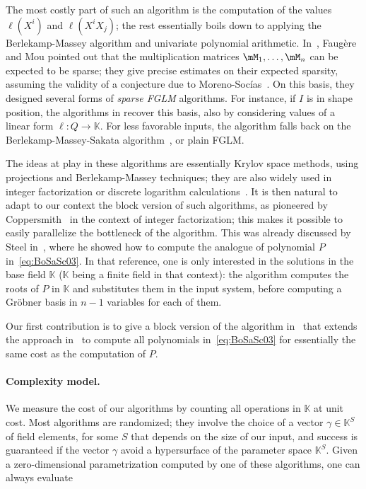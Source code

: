 \documentclass[12pt]{article}
\def\K{\mathbb{K}}
\def\K {\ensuremath{\mathbb{K}}}
\begin{document}
The most costly part of such an algorithm is the computation of the
values $\ell(X^i)$ and $\ell(X^i X_j)$; the rest essentially boils
down to applying the Berlekamp-Massey algorithm and univariate
polynomial arithmetic. In~\cite{FaMo17}, Faug{\`e}re and Mou pointed
out that the multiplication matrices $\mM_1,\dots,\mM_n$ can be
expected to be sparse; they give precise estimates on their expected
sparsity, assuming the validity of a conjecture due to
Moreno-Soc\'ias~\cite{MorenoSocias91}. 
On this basis, they designed several forms of {\em sparse FGLM}
algorithms. For instance, if $I$ is in shape position, the algorithms
in \cite{FaMo17} recover this basis, also by considering values of
a linear form $\ell:Q \to \K$. For less favorable inputs, the algorithm
falls back on the Berlekamp-Massey-Sakata algorithm~\cite{Sakata90},
or plain FGLM.

The ideas at play in these algorithms are essentially Krylov space
methods, using projections and Berlekamp-Massey techniques; they are
also widely used in integer factorization or discrete logarithm
calculations~\cite{xxx,yyy}. It is then natural to adapt to our
context the block version of such algorithms, as pioneered by
Coppersmith~\cite{Coppersmith94} in the context of integer
factorization; this makes it possible to easily parallelize the
bottleneck of the algorithm. This was already discussed by Steel
in~\cite{Steel15}, where he showed how to compute the analogue of
polynomial $P$ in~\eqref{eq:BoSaSc03}. In that reference, one is
only interested in the solutions in the base field $\K$ ($\K$ being a
finite field in that context): the algorithm computes the roots of $P$
in $\K$ and substitutes them in the input system, before computing a
Gr\"obner basis in $n-1$ variables for each of them.

Our first contribution is to give a block version of
the algorithm in~\cite{BoSaSc03} that extends the approach
in~\cite{Steel15} to compute all polynomials in~\eqref{eq:BoSaSc03}
for essentially the same cost as the computation of $P$.


\paragraph{Complexity model.}
We measure the cost of our algorithms by counting all operations in
$\K$ at unit cost. Most algorithms are randomized; they involve the
choice of a vector $\gamma \in \K^S$ of field elements, for some $S$
that depends on the size of our input, and success is guaranteed if
the vector $\gamma$ avoid a hypersurface of the parameter space
$\K^S$. Given a zero-dimensional parametrization computed by one of
these algorithms, one can always evaluate 
\end{document}
